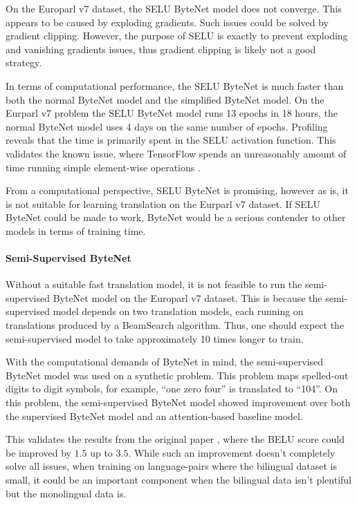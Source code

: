 On the Europarl v7 dataset, the SELU ByteNet model does not converge. This appears to be caused by exploding gradients. Such issues could be solved by gradient clipping. However, the purpose of SELU is exactly to prevent exploding and vanishing gradients issues, thus gradient clipping is likely not a good strategy.

In terms of computational performance, the SELU ByteNet is much faster than both the normal ByteNet model and the simplified ByteNet model. On the Eurparl v7 problem the SELU ByteNet model runs 13 epochs in 18 hours, the normal ByteNet model uses 4 days on the same number of epochs. Profiling reveals that the time is primarily spent in the SELU activation function. This validates the known issue, where TensorFlow spends an unreasonably amount of time running simple element-wise operations \cite{google-xla}.

From a computational perspective, SELU ByteNet is promising, however as is, it is not suitable for learning translation on the Eurparl v7 dataset. If SELU ByteNet could be made to work, ByteNet would be a serious contender to other models in terms of training time.

\paragraph{Semi-Supervised ByteNet} Without a suitable fast translation model, it is not feasible to run the semi-supervised ByteNet model on the Europarl v7 dataset. This is because the semi-supervised model depends on two translation models, each running on translations produced by a BeamSearch algorithm. Thus, one should expect the semi-supervised model to take approximately 10 times longer to train. 

With the computational demands of ByteNet in mind, the semi-supervised ByteNet model was used on a synthetic problem. This problem maps spelled-out digits to digit symbols, for example, ``one zero four'' is translated to ``104''. On this problem, the semi-supervised ByteNet model showed improvement over both the supervised ByteNet model and an attention-based baseline model.

This validates the results from the original paper \cite{semi-supervised}, where the BELU score could be improved by $1.5$ up to $3.5$. While such an improvement doesn't completely solve all issues, when training on language-pairs where the bilingual dataset is small, it could be an important component when the bilingual data isn't plentiful but the monolingual data is.

